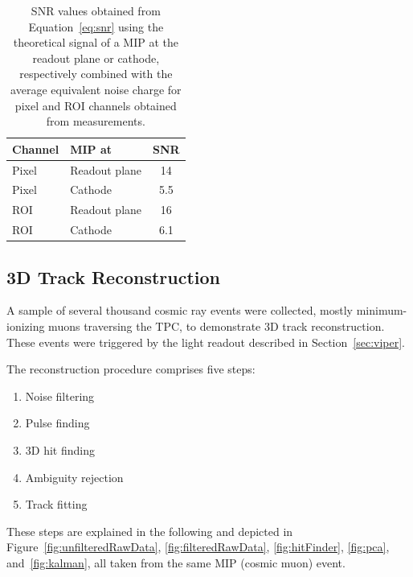 \documentclass[instruments,article,accept,moreauthors,pdftex]{Definitions/mdpi}
\begin{document}
\begin{table}[H]
	\centering
	\caption{SNR values obtained from Equation~\eqref{eq:snr} using the theoretical signal of a MIP at the readout plane or cathode, respectively combined with the average equivalent noise charge for pixel and ROI channels obtained from measurements.}
	\label{tab:snr}
	\begin{tabu} to \textwidth {llS}
		\toprule
		{\textbf{Channel}} &	{\textbf{MIP at}} &			{\textbf{SNR}} \\
		
		\midrule
		{Pixel} &	{Readout plane} &	\num{14} \\
		\midrule
		{Pixel} &	{Cathode} &			\num{5.5} \\
		\midrule
		{ROI} &		{Readout plane} &	\num{16} \\
		\midrule
		{ROI} &		{Cathode} &			\num{6.1} \\
		\bottomrule
	\end{tabu}
\end{table}


\subsection{3D Track Reconstruction}

A sample of several thousand cosmic ray events were collected, mostly minimum-ionizing muons traversing the TPC, to demonstrate 3D track reconstruction.
These events were triggered by the light readout described in Section~\ref{sec:viper}.

The reconstruction procedure comprises five steps:
\begin{enumerate}
	\item Noise filtering
	\item Pulse finding
	\item 3D hit finding
	\item Ambiguity rejection
	\item Track fitting
\end{enumerate}

These steps are explained in the following and depicted in Figure~\ref{fig:unfilteredRawData}, \ref{fig:filteredRawData}, \ref{fig:hitFinder}, \ref{fig:pca}, and~\ref{fig:kalman}, all taken from the same MIP (cosmic muon) event.
\end{document}
